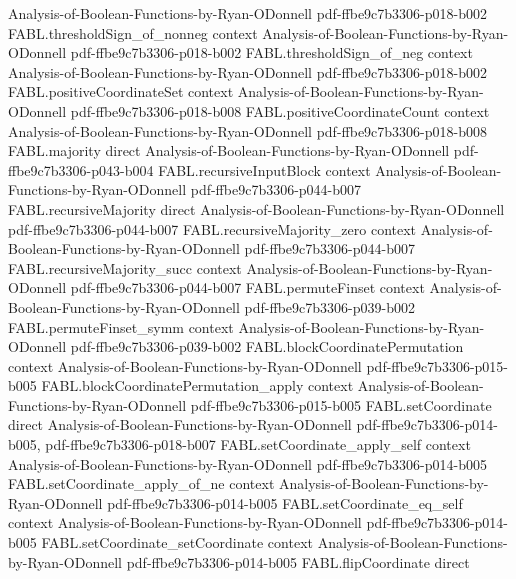 \begin{theorem}
  {Analysis-of-Boolean-Functions-by-Ryan-ODonnell}
  {pdf-ffbe9c7b3306-p018-b002}
\proofstep
  {FABL.thresholdSign_of_nonneg}
  {context}
  {Analysis-of-Boolean-Functions-by-Ryan-ODonnell}
  {pdf-ffbe9c7b3306-p018-b002}
\proofstep
  {FABL.thresholdSign_of_neg}
  {context}
  {Analysis-of-Boolean-Functions-by-Ryan-ODonnell}
  {pdf-ffbe9c7b3306-p018-b002}
\proofstep
  {FABL.positiveCoordinateSet}
  {context}
  {Analysis-of-Boolean-Functions-by-Ryan-ODonnell}
  {pdf-ffbe9c7b3306-p018-b008}
\proofstep
  {FABL.positiveCoordinateCount}
  {context}
  {Analysis-of-Boolean-Functions-by-Ryan-ODonnell}
  {pdf-ffbe9c7b3306-p018-b008}
\proofstep
  {FABL.majority}
  {direct}
  {Analysis-of-Boolean-Functions-by-Ryan-ODonnell}
  {pdf-ffbe9c7b3306-p043-b004}
\proofstep
  {FABL.recursiveInputBlock}
  {context}
  {Analysis-of-Boolean-Functions-by-Ryan-ODonnell}
  {pdf-ffbe9c7b3306-p044-b007}
\proofstep
  {FABL.recursiveMajority}
  {direct}
  {Analysis-of-Boolean-Functions-by-Ryan-ODonnell}
  {pdf-ffbe9c7b3306-p044-b007}
\proofstep
  {FABL.recursiveMajority_zero}
  {context}
  {Analysis-of-Boolean-Functions-by-Ryan-ODonnell}
  {pdf-ffbe9c7b3306-p044-b007}
\proofstep
  {FABL.recursiveMajority_succ}
  {context}
  {Analysis-of-Boolean-Functions-by-Ryan-ODonnell}
  {pdf-ffbe9c7b3306-p044-b007}
\proofstep
  {FABL.permuteFinset}
  {context}
  {Analysis-of-Boolean-Functions-by-Ryan-ODonnell}
  {pdf-ffbe9c7b3306-p039-b002}
\proofstep
  {FABL.permuteFinset_symm}
  {context}
  {Analysis-of-Boolean-Functions-by-Ryan-ODonnell}
  {pdf-ffbe9c7b3306-p039-b002}
\proofstep
  {FABL.blockCoordinatePermutation}
  {context}
  {Analysis-of-Boolean-Functions-by-Ryan-ODonnell}
  {pdf-ffbe9c7b3306-p015-b005}
\proofstep
  {FABL.blockCoordinatePermutation_apply}
  {context}
  {Analysis-of-Boolean-Functions-by-Ryan-ODonnell}
  {pdf-ffbe9c7b3306-p015-b005}
\proofstep
  {FABL.setCoordinate}
  {direct}
  {Analysis-of-Boolean-Functions-by-Ryan-ODonnell}
  {pdf-ffbe9c7b3306-p014-b005,
    pdf-ffbe9c7b3306-p018-b007}
\proofstep
  {FABL.setCoordinate_apply_self}
  {context}
  {Analysis-of-Boolean-Functions-by-Ryan-ODonnell}
  {pdf-ffbe9c7b3306-p014-b005}
\proofstep
  {FABL.setCoordinate_apply_of_ne}
  {context}
  {Analysis-of-Boolean-Functions-by-Ryan-ODonnell}
  {pdf-ffbe9c7b3306-p014-b005}
\proofstep
  {FABL.setCoordinate_eq_self}
  {context}
  {Analysis-of-Boolean-Functions-by-Ryan-ODonnell}
  {pdf-ffbe9c7b3306-p014-b005}
\proofstep
  {FABL.setCoordinate_setCoordinate}
  {context}
  {Analysis-of-Boolean-Functions-by-Ryan-ODonnell}
  {pdf-ffbe9c7b3306-p014-b005}
\proofstep
  {FABL.flipCoordinate}
  {direct}

\end{theorem}
